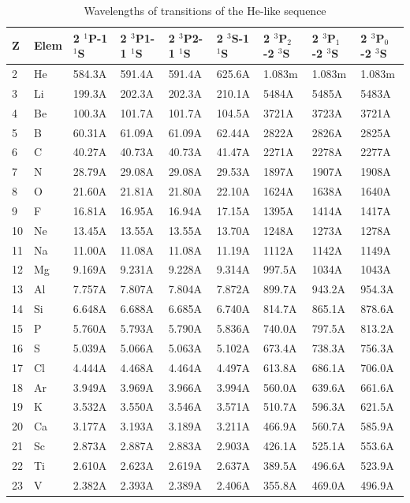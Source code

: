 \begin{table}
\label{tab:HeLikeWavelengths}
\caption{Wavelengths of transitions of the He-like sequence}
\begin{tabular}{lllllllll}
\hline
Z& Elem& 2 $^1$P-1 $^1$S& 2 $^3$P1-1 $^1$S& 2 $^3$P2-1 $^1$S& 2 $^3$S-1
$^1$S& 2 $^3$P$_2$-2 $^3$S& 2 $^3$P$_1$-2 $^3$S& 2 $^3$P$_0$-2 $^3$S\\
\hline
2&He& 584.3A& 591.4A& 591.4A& 625.6A& 1.083m& 1.083m& 1.083m\\
3& Li& 199.3A& 202.3A& 202.3A& 210.1A&
5484A& 5485A& 5483A\\
4& Be& 100.3A& 101.7A& 101.7A& 104.5A& 3721A& 3723A& 3721A\\
5& B&
60.31A& 61.09A& 61.09A& 62.44A& 2822A& 2826A& 2825A\\
6& C& 40.27A& 40.73A& 40.73A& 41.47A& 2271A&
2278A& 2277A\\
7& N& 28.79A& 29.08A& 29.08A& 29.53A& 1897A& 1907A& 1908A\\
8& O&
21.60A& 21.81A& 21.80A& 22.10A& 1624A& 1638A& 1640A\\
9& F& 16.81A& 16.95A& 16.94A& 17.15A& 1395A&
1414A& 1417A\\
10& Ne& 13.45A& 13.55A& 13.55A& 13.70A& 1248A& 1273A&
1278A\\
11& Na& 11.00A& 11.08A& 11.08A& 11.19A& 1112A& 1142A&
1149A\\
12& Mg& 9.169A& 9.231A& 9.228A& 9.314A& 997.5A& 1034A&
1043A\\
13& Al& 7.757A& 7.807A&7.804A& 7.872A& 899.7A& 943.2A& 954.3A\\
14& Si& 6.648A& 6.688A& 6.685A& 6.740A& 814.7A& 865.1A& 878.6A\\
15& P& 5.760A& 5.793A& 5.790A& 5.836A& 740.0A& 797.5A& 813.2A\\
16& S& 5.039A& 5.066A& 5.063A& 5.102A& 673.4A& 738.3A& 756.3A\\
17& Cl& 4.444A& 4.468A& 4.464A& 4.497A& 613.8A& 686.1A& 706.0A\\
18& Ar& 3.949A& 3.969A& 3.966A& 3.994A& 560.0A& 639.6A& 661.6A\\
19& K& 3.532A& 3.550A& 3.546A& 3.571A& 510.7A& 596.3A& 621.5A\\
20& Ca& 3.177A& 3.193A& 3.189A& 3.211A& 466.9A& 560.7A& 585.9A\\
21& Sc& 2.873A& 2.887A& 2.883A& 2.903A& 426.1A& 525.1A& 553.6A\\
22&Ti& 2.610A& 2.623A& 2.619A& 2.637A& 389.5A& 496.6A& 523.9A\\
23&V& 2.382A& 2.393A& 2.389A& 2.406A& 355.8A& 469.0A& 496.9A\\

\end{tabular}
\end{table}
